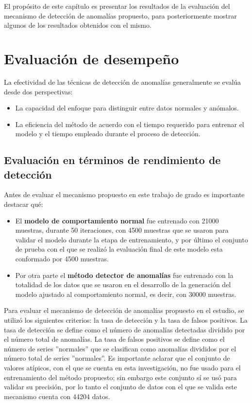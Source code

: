 El prop\'{o}sito de este cap\'{i}tulo es presentar los resultados de la evaluaci\'{o}n del mecanismo de detecci\'{o}n de anomal\'{i}as propuesto, para posteriormente mostrar algunos de los resultados obtenidos con el mismo.

\section{Evaluaci\'{o}n de desempe\~{n}o}

La efectividad de las t\'{e}cnicas de detecci\'{o}n de anomal\'{i}as generalmente se eval\'{u}a desde dos perspectivas:
\begin{itemize}
\item La capacidad del enfoque para distinguir entre datos normales y an\'{o}malos.
\item La eficiencia del m\'{e}todo de acuerdo con el tiempo requerido para entrenar el modelo y el tiempo empleado durante el proceso de detecci\'{o}n.

\end{itemize}

\subsection{Evaluación en términos de rendimiento de detección}

Antes de evaluar el mecanismo propuesto en este trabajo de grado es importante destacar qu\'{e}:

\begin{itemize}
\item El \textbf{modelo de comportamiento normal} fue entrenado con 21000 muestras, durante 50 iteraciones, con 4500 muestras que se usaron para validar el modelo durante la etapa de entrenamiento, y por \'{u}ltimo el conjunto de prueba con el que se realiz\'{o} la evaluaci\'{o}n final de este modelo esta conformado por 4500 muestras.
\item Por otra parte el \textbf{m\'{e}todo detector de anomal\'{i}as} fue entrenado con la totalidad de los datos que se usaron en el desarrollo de la generaci\'{o}n del modelo ajustado al comportamiento normal, es decir, con 30000 muestras.
\end{itemize}

Para evaluar el mecanismo de detecci\'{o}n de anomal\'{i}as propuesto en el estudio, se utiliz\'{o} los siguientes criterios: la tasa de detecci\'{o}n y la tasa de falsos positivos. La tasa de detección se define como el número de anomal\'{i}as detectadas dividido por el número total de anomal\'{i}as. La tasa de falsos positivos se define como el número de series ''normales'' que se clasifican como anomal\'{i}as divididos por el número total de series ''normales''. Es importante aclarar que el conjunto de valores at\'{i}picos, con el que se cuenta en esta investigaci\'{o}n, no fue usado para el entrenamiento del m\'{e}todo propuesto; sin embargo este conjunto s\'{i} se us\'{o} para validar su precisi\'{o}n, por lo tanto el conjunto de datos con el que se valida este mecanismo cuenta con 44204 datos.
 
